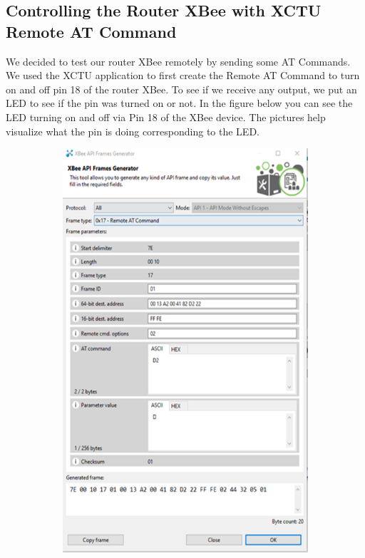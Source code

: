 	\subsection{Controlling the Router XBee with XCTU Remote AT Command}
	\par We decided to test our router XBee remotely by sending some AT Commands. We used the XCTU application to first create the Remote AT Command to turn on and off pin 18 of the router XBee. To see if we receive any output, we put an LED to see if the pin was turned on or not. In the figure below you can see the LED turning on and off via Pin 18 of the XBee device. The pictures help visualize what the pin is doing corresponding to the LED.
	\begin{figure}[h!]
		\centering
		\begin{subfigure}[t]{0.22\textwidth}
			\centering
			\includegraphics[width=\textwidth]{xbeeXctu1.png}

\end{subfigure}
\end{figure}
